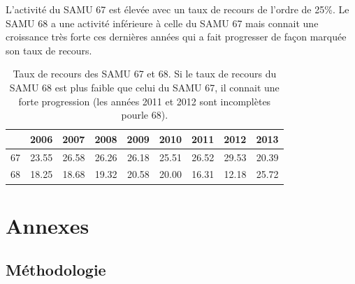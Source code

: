 \documentclass[12pt,english,french,twoside]{book}\usepackage[]{graphicx}\usepackage[]{color}
\begin{document}
L'activité du SAMU 67 est élevée avec un taux de recours de l'ordre de 25\%. Le SAMU 68 a une activité inférieure à celle du SAMU 67 mais connait une croissance très forte ces dernières années qui a fait progresser de façon marquée son taux de recours.

\begin{table}[ht]
\centering
\begin{tabular}{rrrrrrrrr}
  \hline
 & 2006 & 2007 & 2008 & 2009 & 2010 & 2011 & 2012 & 2013 \\ 
  \hline
67 & 23.55 & 26.58 & 26.26 & 26.18 & 25.51 & 26.52 & 29.53 & 20.39 \\ 
  68 & 18.25 & 18.68 & 19.32 & 20.58 & 20.00 & 16.31 & 12.18 & 25.72 \\ 
   \hline
\end{tabular}
\caption[Taux de recours des SAMU]{Taux de recours des SAMU 67 et 68. Si le taux de recours du SAMU 68 est plus faible que celui du SAMU 67, il connait une forte progression (les années 2011 et 2012 sont incomplètes pourle 68).} 
\label{fig.rec}
\end{table}








\part{Annexes}

\newpage
\appendix
\chapter{Méthodologie}
\end{document}

